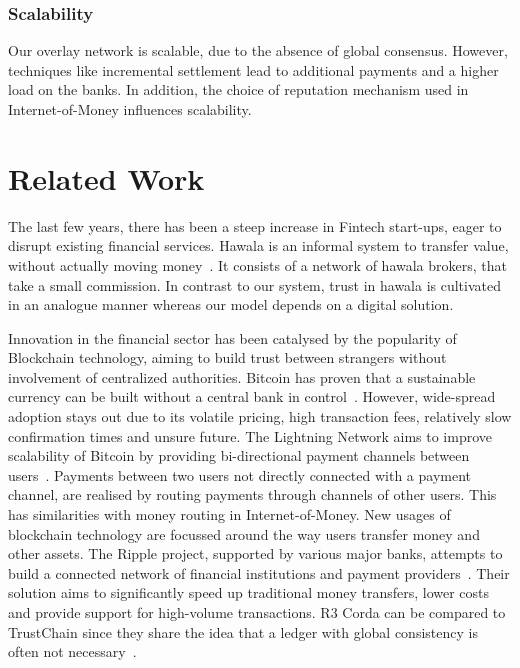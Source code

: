 \subsubsection*{Scalability}
Our overlay network is scalable, due to the absence of global consensus.
However, techniques like incremental settlement lead to additional payments and a higher load on the banks.
In addition, the choice of reputation mechanism used in Internet-of-Money influences scalability.

\section{Related Work}
The last few years, there has been a steep increase in Fintech start-ups, eager to disrupt existing financial services.
Hawala is an informal system to transfer value, without actually moving money~\cite{jost2003hawala}.
It consists of a network of hawala brokers, that take a small commission.
In contrast to our system, trust in hawala is cultivated in an analogue manner whereas our model depends on a digital solution.

Innovation in the financial sector has been catalysed by the popularity of Blockchain technology, aiming to build trust between strangers without involvement of centralized authorities.
Bitcoin has proven that a sustainable currency can be built without a central bank in control~\cite{nakamoto2008bitcoin}.
However, wide-spread adoption stays out due to its volatile pricing, high transaction fees, relatively slow confirmation times and unsure future.
The Lightning Network aims to improve scalability of Bitcoin by providing bi-directional payment channels between users~\cite{poon2016bitcoin}.
Payments between two users not directly connected with a payment channel, are realised by routing payments through channels of other users.
This has similarities with money routing in Internet-of-Money.
New usages of blockchain technology are focussed around the way users transfer money and other assets.
The Ripple project, supported by various major banks, attempts to build a connected network of financial institutions and payment providers~\cite{schwartz2014ripple}.
Their solution aims to significantly speed up traditional money transfers, lower costs and provide support for high-volume transactions.
R3 Corda can be compared to TrustChain since they share the idea that a ledger with global consistency is often not necessary~\cite{brown2016introducing}.

